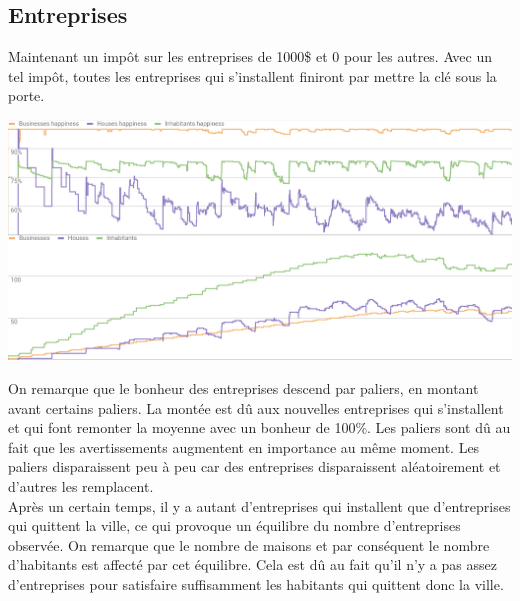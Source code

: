 \documentclass[11pt]{report}
\begin{document}
\subsection{Entreprises}
Maintenant un impôt sur les entreprises de 1000\$ et 0 pour les autres. Avec un tel impôt, toutes les entreprises qui s'installent finiront par mettre la clé sous la porte.
\begin{center}
	\includegraphics[width=\textwidth]{businesses_taxes}
\end{center}
On remarque que le bonheur des entreprises descend par paliers, en montant avant certains paliers. La montée est dû aux nouvelles entreprises qui s'installent et qui font remonter la moyenne avec un bonheur de 100\%. Les paliers sont dû au fait que les avertissements augmentent en importance au même moment. Les paliers disparaissent peu à peu car des entreprises disparaissent aléatoirement et d'autres les remplacent.\\
Après un certain temps, il y a autant d'entreprises qui installent que d'entreprises qui quittent la ville, ce qui provoque un équilibre du nombre d'entreprises observée.
On remarque que le nombre de maisons et par conséquent le nombre d'habitants est affecté par cet équilibre. Cela est dû au fait qu'il n'y a pas assez d'entreprises pour satisfaire suffisamment les habitants qui quittent donc la ville.

\newpage
\end{document}
